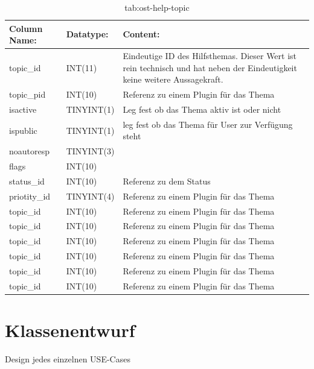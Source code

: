 \begin{table}[h]
	\begin{tabular}{|p{3.5cm}|p{4cm}|p{7.2cm}|}
		\hline
		\textbf{Column Name:} & \textbf{Datatype:} & \textbf{Content:}\\
		\hline
		topic\_id & INT(11) & Eindeutige ID des Hilfsthemas. Dieser Wert ist rein technisch und hat  neben der Eindeutigkeit keine weitere Aussagekraft.\\
		\hline
		topic\_pid & INT(10) & Referenz zu einem Plugin für das Thema\\
		\hline
		isactive & TINYINT(1) & Leg fest ob das Thema aktiv ist oder nicht \\
		\hline
		ispublic & TINYINT(1) & leg fest ob das Thema für User zur Verfügung steht\\
		\hline
		noautoresp & TINYINT(3) & \\
		\hline
		flags & INT(10) & \\
		\hline
		status\_id & INT(10) & Referenz zu dem Status \\
		\hline
		priotity\_id & TINYINT(4) & Referenz zu einem Plugin für das Thema\\
		\hline
		topic\_id & INT(10) & Referenz zu einem Plugin für das Thema\\
		\hline
		topic\_id & INT(10) & Referenz zu einem Plugin für das Thema\\
		\hline
		topic\_id & INT(10) & Referenz zu einem Plugin für das Thema\\
		\hline
		topic\_id & INT(10) & Referenz zu einem Plugin für das Thema\\
		\hline
		topic\_id & INT(10) & Referenz zu einem Plugin für das Thema\\
		\hline
		topic\_id & INT(10) & Referenz zu einem Plugin für das Thema\\
		\hline
		
	\end{tabular}
	\caption{tab:ost-help-topic}
\end{table}
\label{tab:ost_help_topic}

\section{Klassenentwurf}
Design jedes einzelnen USE-Cases

